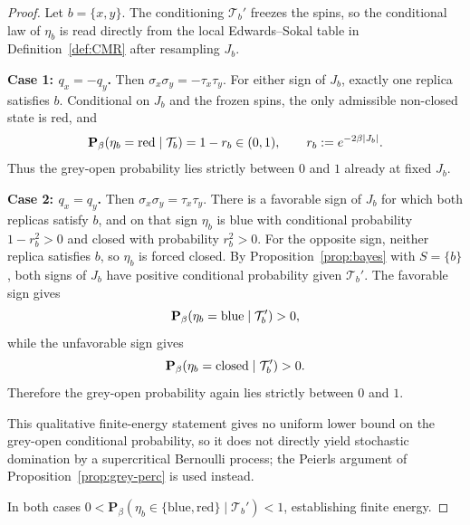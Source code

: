 \documentclass[11pt]{article}
\numberwithin{theorem}{section}
\theoremstyle{remark}
\begin{document}
\begin{proof}
Let $b = \{x, y\}$.
The conditioning $\mathcal{T}_b'$ freezes the spins, so the conditional law of $\eta_b$ is read directly from the local Edwards--Sokal table in Definition~\ref{def:CMR} after resampling $J_b$.

\medskip\noindent
\textbf{Case 1: $q_x=-q_y$.}
Then $\sigma_x\sigma_y=-\tau_x\tau_y$.
For either sign of $J_b$, exactly one replica satisfies $b$.
Conditional on $J_b$ and the frozen spins, the only admissible non-closed state is red, and
\[
  \mathbf{P}_\beta(\eta_b = \textup{red} \mid \mathcal{T}_b)
  = 1-r_b \in (0,1),
  \qquad r_b := e^{-2\beta|J_b|}.
\]
Thus the grey-open probability lies strictly between $0$ and $1$ already at fixed $J_b$.

\medskip\noindent
\textbf{Case 2: $q_x=q_y$.}
Then $\sigma_x\sigma_y=\tau_x\tau_y$.
There is a favorable sign of $J_b$ for which both replicas satisfy $b$, and on that sign $\eta_b$ is blue with conditional probability $1-r_b^2>0$ and closed with probability $r_b^2>0$.
For the opposite sign, neither replica satisfies $b$, so $\eta_b$ is forced closed.
By Proposition~\ref{prop:bayes} with $S=\{b\}$, both signs of $J_b$ have positive conditional probability given $\mathcal{T}_b'$.
The favorable sign gives
\[
  \mathbf{P}_\beta(\eta_b = \textup{blue} \mid \mathcal{T}_b') > 0,
\]
while the unfavorable sign gives
\[
  \mathbf{P}_\beta(\eta_b = \textup{closed} \mid \mathcal{T}_b') > 0.
\]
Therefore the grey-open probability again lies strictly between $0$ and $1$.

This qualitative finite-energy statement gives no uniform lower bound on the grey-open conditional probability, so it does not directly yield stochastic domination by a supercritical Bernoulli process; the Peierls argument of Proposition~\ref{prop:grey-perc} is used instead.

\medskip\noindent
In both cases $0 < \mathbf{P}_\beta(\eta_b \in \{\text{blue}, \text{red}\} \mid \mathcal{T}_b') < 1$, establishing finite energy.
\end{proof}
\end{document}
